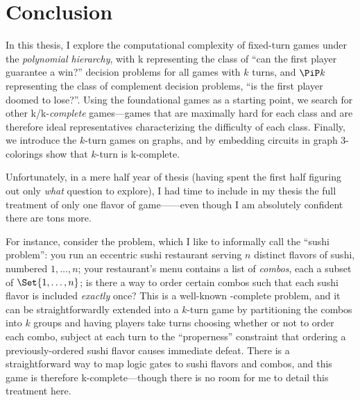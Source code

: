 \chapter{Conclusion}

\label{ch:conclusion}

In this thesis, I explore the computational complexity of fixed-turn games under
the \emph{polynomial hierarchy}, with \SigmaP k representing the class of ``can
the first player guarantee a win?'' decision problems for all games with \(k\)
turns, and \(\PiP k\) representing the class of complement decision problems,
``is the first player doomed to lose?''.  Using the foundational
 games as a starting point, we search for other
\SigmaP k/\PiP k-\emph{complete} games—games that are maximally hard for each
class and are therefore ideal representatives characterizing the difficulty of
each class.  Finally, we introduce the \(k\)-turn 
games on graphs, and by embedding circuits in graph 3-colorings show that
\(k\)-turn  is \SigmaP k-complete.

Unfortunately, in a mere half year of thesis (having spent the first half
figuring out only \emph{what} question to explore), I had time to include in my
thesis the full treatment of only one flavor of
game——even though I am absolutely confident there are
tons more.

For instance, consider the  problem, which I like to
informally call the ``sushi problem'': you run an eccentric sushi restaurant
serving \(n\) distinct flavors of sushi, numbered \(1,\dotsc,n\); your
restaurant's menu contains a list of \emph{combos}, each a subset of
\(\Set{1,\dotsc,n}\); is there a way to order certain combos such that each
sushi flavor is included \emph{exactly} once?  This is a well-known \NP-complete
problem, and it can be straightforwardly extended into a \(k\)-turn game by
partitioning the combos into \(k\) groups and having players take turns choosing
whether or not to order each combo, subject at each turn to the ``properness''
constraint that ordering a previously-ordered sushi flavor causes immediate
defeat.  There is a straightforward way to map logic gates to sushi flavors and
combos, and this game is therefore \SigmaP k-complete—though there is no room
for me to detail this treatment here.

